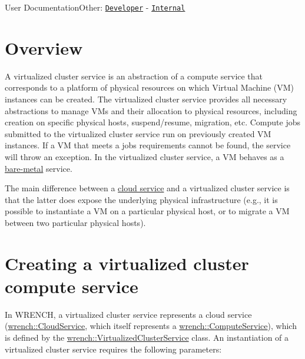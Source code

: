 User DocumentationOther\+: \href{../developer/guide-virtualizedcluster.html}{\tt Developer} -\/ \href{../internal/guide-virtualizedcluster.html}{\tt Internal}\hypertarget{guide-virtualizedcluster_guide-virtualizedcluster-overview}{}\section{Overview}\label{guide-virtualizedcluster_guide-virtualizedcluster-overview}
A virtualized cluster service is an abstraction of a compute service that corresponds to a platform of physical resources on which Virtual Machine (VM) instances can be created. The virtualized cluster service provides all necessary abstractions to manage V\+Ms and their allocation to physical resources, including creation on specific physical hosts, suspend/resume, migration, etc. Compute jobs submitted to the virtualized cluster service run on previously created VM instances. If a VM that meets a job\textquotesingle{}s requirements cannot be found, the service will throw an exception. In the virtualized cluster service, a VM behaves as a \hyperlink{guide-baremetal}{bare-\/metal} service.

The main difference between a \hyperlink{guide-cloud}{cloud service} and a virtualized cluster service is that the latter does expose the underlying physical infrastructure (e.\+g., it is possible to instantiate a VM on a particular physical host, or to migrate a VM between two particular physical hosts).\hypertarget{guide-virtualizedcluster_guide-virtualizedcluster-creating}{}\section{Creating a virtualized cluster compute service}\label{guide-virtualizedcluster_guide-virtualizedcluster-creating}
In W\+R\+E\+N\+CH, a virtualized cluster service represents a cloud service (\hyperlink{classwrench_1_1_cloud_service}{wrench\+::\+Cloud\+Service}, which itself represents a \hyperlink{classwrench_1_1_compute_service}{wrench\+::\+Compute\+Service}), which is defined by the \hyperlink{classwrench_1_1_virtualized_cluster_service}{wrench\+::\+Virtualized\+Cluster\+Service} class. An instantiation of a virtualized cluster service requires the following parameters\+:


